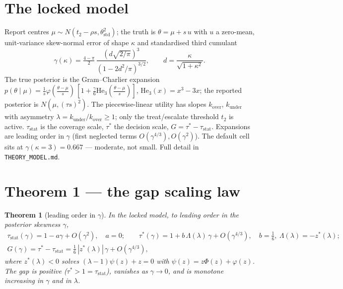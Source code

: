 \documentclass[11pt]{article}
\theoremstyle{plain}
\newtheorem{theorem}{Theorem}
\theoremstyle{definition}
\newcommand{\taustat}{\tau_{\mathrm{stat}}}
\newcommand{\taustar}{\tau^{*}}
\newcommand{\He}{\mathrm{He}}
\begin{document}
\section{The locked model}
Report centres $\mu\sim N(t_2-\rho s,\theta_{\mathrm{std}}^2)$; the truth is $\theta=\mu+s\,u$ with $u$
a zero-mean, unit-variance skew-normal error of shape $\kappa$ and standardised third cumulant
\[
  \gamma(\kappa)=\tfrac{4-\pi}{2}\,\frac{(d\sqrt{2/\pi})^3}{(1-2d^2/\pi)^{3/2}},\qquad d=\frac{\kappa}{\sqrt{1+\kappa^2}}.
\]
The true posterior is the Gram--Charlier expansion
$p(\theta\mid\mu)=\tfrac1s\varphi(\tfrac{\theta-\mu}{s})\,[1+\tfrac{\gamma}{6}\He_3(\tfrac{\theta-\mu}{s})]$,
$\He_3(x)=x^3-3x$; the reported posterior is $N(\mu,(\tau s)^2)$. The piecewise-linear utility has
slopes $k_{\mathrm{over}}$, $k_{\mathrm{under}}$ with asymmetry $\lambda=k_{\mathrm{under}}/k_{\mathrm{over}}\ge1$;
only the treat/escalate threshold $t_2$ is active. $\taustat$ is the coverage scale, $\taustar$ the
decision scale, $G=\taustar-\taustat$. Expansions are leading order in $\gamma$ (first neglected terms
$O(\gamma^{4/3}),O(\gamma^2)$). The default cell sits at $\gamma(\kappa{=}3)=0.667$ --- moderate, not
small. Full detail in \texttt{THEORY\_MODEL.md}.

\section{Theorem 1 --- the gap scaling law}
\begin{theorem}[leading order in $\gamma$]
In the locked model, to leading order in the posterior skewness $\gamma$,
\begin{gather*}
  \taustat(\gamma)=1-a\gamma+O(\gamma^2),\quad a=0;\qquad
  \taustar(\gamma)=1+b\,\Lambda(\lambda)\,\gamma+O(\gamma^{4/3}),\quad b=\tfrac16,\ \Lambda(\lambda)=-z^*(\lambda);\\
  G(\gamma)=\taustar-\taustat=\tfrac16\,|z^*(\lambda)|\,\gamma+O(\gamma^{4/3}),
\end{gather*}
where $z^*(\lambda)<0$ solves $(\lambda-1)\psi(z)+z=0$ with $\psi(z)=z\Phi(z)+\varphi(z)$. The gap is
positive ($\taustar>1=\taustat$), vanishes as $\gamma\to0$, and is monotone increasing in $\gamma$ and
in $\lambda$.
\end{theorem}
\end{document}
